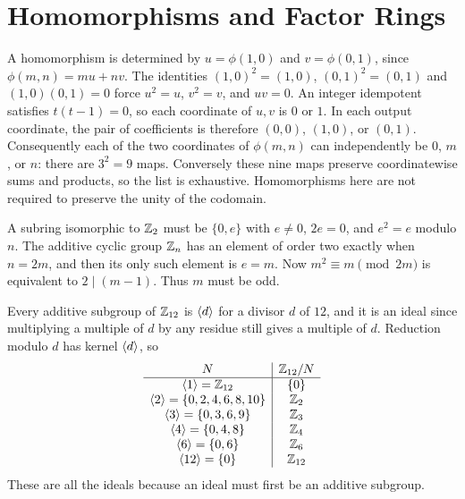 \section{Homomorphisms and Factor Rings}

\idea A homomorphism is determined by $u=\phi(1,0)$ and $v=\phi(0,1)$, since $\phi(m,n)=mu+nv$.
The identities $(1,0)^2=(1,0)$, $(0,1)^2=(0,1)$ and $(1,0)(0,1)=0$ force $u^2=u$, $v^2=v$, and $uv=0$.
An integer idempotent satisfies $t(t-1)=0$, so each coordinate of $u,v$ is $0$ or $1$. In each output coordinate, the pair of coefficients is therefore $(0,0)$, $(1,0)$, or $(0,1)$.
Consequently each of the two coordinates of $\phi(m,n)$ can independently be $0$, $m$, or $n$: there are $3^2=9$ maps. Conversely these nine maps preserve coordinatewise sums and products, so the list is exhaustive. Homomorphisms here are not required to preserve the unity of the codomain.

A subring isomorphic to $\mathbb{Z}_2$ must be $\{0,e\}$ with $e\ne0$, $2e=0$, and $e^2=e$ modulo $n$. The additive cyclic group $\mathbb{Z}_n$ has an element of order two exactly when $n=2m$, and then its only such element is $e=m$.
Now $m^2\equiv m\pmod{2m}$ is equivalent to $2\mid(m-1)$. Thus $m$ must be odd.

Every additive subgroup of $\mathbb{Z}_{12}$ is $\langle d\rangle$ for a divisor $d$ of $12$, and it is an ideal since multiplying a multiple of $d$ by any residue still gives a multiple of $d$. Reduction modulo $d$ has kernel $\langle d\rangle$, so
\[
\begin{array}{c|c}
N&\mathbb{Z}_{12}/N\\\hline
\langle 1\rangle=\mathbb{Z}_{12}&\{0\}\\
\langle 2\rangle=\{0,2,4,6,8,10\}&\mathbb{Z}_2\\
\langle 3\rangle=\{0,3,6,9\}&\mathbb{Z}_3\\
\langle 4\rangle=\{0,4,8\}&\mathbb{Z}_4\\
\langle 6\rangle=\{0,6\}&\mathbb{Z}_6\\
\langle 12\rangle=\{0\}&\mathbb{Z}_{12}
\end{array}
\]
These are all the ideals because an ideal must first be an additive subgroup.

